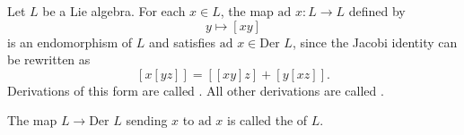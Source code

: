 Let $L$ be a Lie algebra. For each $x \in L$, the map $\text{ad } x: L \rightarrow L$ defined by
$$y \mapsto [xy]$$
is an endomorphism of $L$ and satisfies $\text{ad } x \in \text{Der } L$, since the Jacobi identity can be rewritten as
$$[x[yz]] = [[xy]z] + [y[xz]].$$
Derivations of this form are called . All other derivations are called .

The map $L \rightarrow \text{Der } L$ sending $x$ to $\text{ad } x$ is called the  of $L$.
